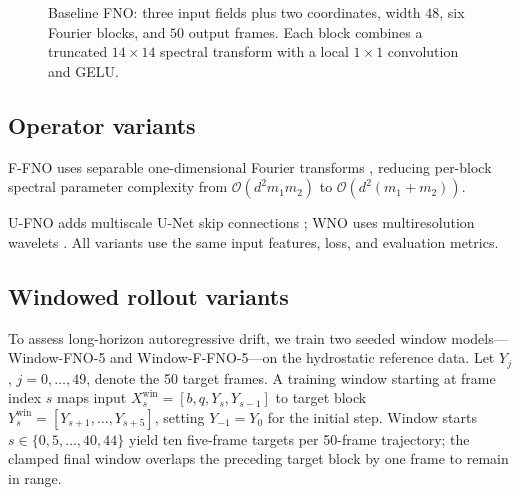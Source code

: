 \begin{figure}[pos=!htbp]
\caption{Baseline FNO: three input fields plus two coordinates, width $48$, six Fourier blocks, and $50$ output frames. Each block combines a truncated $14\times14$ spectral transform with a local $1\times1$ convolution and GELU.}
\label{fig:fno-arch}
\end{figure}

\FloatBarrier
\subsection{Operator variants}
\label{subsec:operator-variants}
F-FNO uses separable one-dimensional Fourier transforms \citep{tran2023ffno}, reducing per-block spectral parameter complexity from $\mathcal{O}(d^2m_1m_2)$ to $\mathcal{O}(d^2(m_1+m_2))$.

U-FNO adds multiscale U-Net skip connections \citep{wen2022ufno}; WNO uses multiresolution wavelets \citep{tripura2023wno}. All variants use the same input features, loss, and evaluation metrics.

\subsection{Windowed rollout variants}
\label{subsec:window-models}
To assess long-horizon autoregressive drift, we train two seeded window models—Window-FNO-5 and Window-F-FNO-5—on the hydrostatic reference data. Let $Y_j$, $j = 0,\ldots,49$, denote the 50 target frames. A training window starting at frame index $s$ maps input $X_s^{\mathrm{win}} = [b, q, Y_s, Y_{s-1}]$ to target block $Y_s^{\mathrm{win}} = [Y_{s+1}, \dots, Y_{s+5}]$, setting $Y_{-1} = Y_0$ for the initial step. Window starts $s \in \{0, 5, \dots, 40, 44\}$ yield ten five-frame targets per 50-frame trajectory; the clamped final window overlaps the preceding target block by one frame to remain in range.

